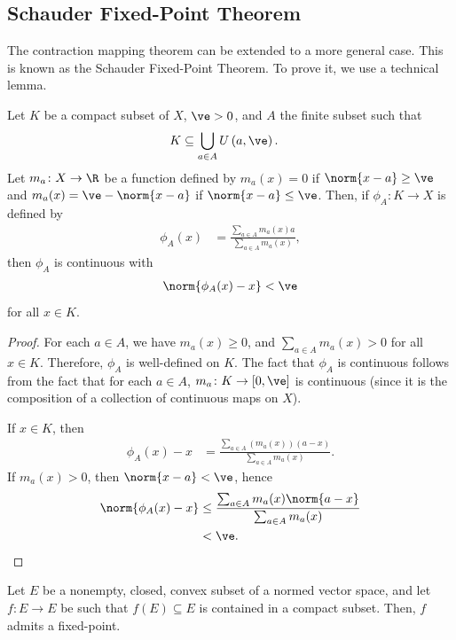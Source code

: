 \documentclass[10pt]{mypackage}
\begin{document}
\subsection{Schauder Fixed-Point Theorem}%
The contraction mapping theorem can be extended to a more general case. This is known as the Schauder Fixed-Point Theorem. To prove it, we use a technical lemma.
\begin{lemma}
  Let $K$ be a compact subset of $X$, $\ve > 0$, and $A$ the finite subset such that
  \begin{align*}
    K &\subseteq \bigcup_{a\in A} U\left( a,\ve \right).
  \end{align*}
  Let $m_a\colon X\rightarrow \R$ be a function defined by $m_a(x) = 0$ if $\norm{x-a} \geq \ve$ and $m_a(x) = \ve - \norm{x-a}$ if $\norm{x-a}\leq \ve$. Then, if $\phi_A\colon K\rightarrow X$ is defined by
  \begin{align*}
    \phi_A(x) &= \frac{\sum_{a\in A} m_a(x)a}{\sum_{a\in A}m_a(x)},
  \end{align*}
  then $\phi_A$ is continuous with
  \begin{align*}
    \norm{\phi_A(x) - x} < \ve
  \end{align*}
  for all $x\in K$.
\end{lemma}
\begin{proof}
  For each $a\in A$, we have $m_a(x) \geq 0$, and $\sum_{a\in A} m_a(x) > 0$ for all $x\in K$. Therefore, $\phi_A$ is well-defined on $K$. The fact that $\phi_A$ is continuous follows from the fact that for each $a\in A$, $m_a\colon K\rightarrow [0,\ve]$ is continuous (since it is the composition of a collection of continuous maps on $X$).

  If $x\in K$, then
  \begin{align*}
    \phi_A(x) - x &= \frac{\sum_{a\in A}\left( m_a(x) \right)\left( a-x \right)}{\sum_{a\in A}m_a(x)}.
  \end{align*}
  If $m_a(x) > 0$, then $\norm{x-a} < \ve$, hence
  \begin{align*}
    \norm{\phi_A(x) - x} &\leq \frac{\sum_{a\in A}m_a(x)\norm{a-x}}{\sum_{a\in A}m_a(x)}\\
                         &< \ve.
  \end{align*}
\end{proof}
\begin{theorem}
  Let $E$ be a nonempty, closed, convex subset of a normed vector space, and let $f\colon E\rightarrow E$ be such that $f(E)\subseteq E$ is contained in a compact subset. Then, $f$ admits a fixed-point.
\end{theorem}
\end{document}
